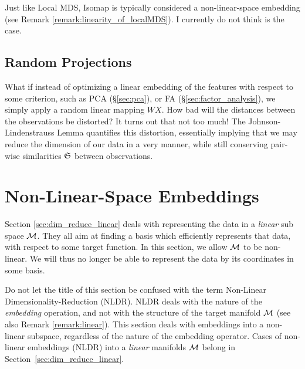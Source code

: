 \begin{remark}
Just like Local MDS, Isomap is typically considered a non-linear-space embedding (see Remark \ref{remark:linearity_of_localMDS}).
I currently do not think is the case.
\end{remark}



\subsection{Random Projections}
\label{sec:random_projections}

What if instead of optimizing a linear embedding of the features with respect to some criterion, such as PCA (\S\ref{sec:pca}), or FA (\S\ref{sec:factor_analysis}), we simply apply a random linear mapping $W X$. How bad will the distances between the observations be distorted? 
It turns out that not too much!
The Johnson-Lindenstrauss Lemma \citep{johnson_extensions_1984} quantifies this distortion, essentially implying that we may reduce the dimension of our data in a very \naive manner, while still conserving pair-wise similarities $\mathfrak{S}$ between observations.
 







\section{Non-Linear-Space Embeddings}
\label{sec:dim_reduce_nonlinear}


Section \ref{sec:dim_reduce_linear} deals with representing the data in a \emph{linear} sub space $\mathcal{M}$. They all aim at finding a basis which efficiently represents that data, with respect to some target function. 
In this section, we allow $\mathcal{M}$ to be non-linear. 
We will thus no longer be able to represent the data by its coordinates in some basis.


\begin{remark}
\label{remark:nldr}
	Do not let the title of this section be confused with the term Non-Linear Dimensionality-Reduction (NLDR).
	NLDR deals with the nature of the \emph{embedding} operation, and not with the structure of the target manifold $\mathcal{M}$ (see also Remark \ref{remark:linear}).
	This section deals with embeddings into a non-linear subspace, regardless of the nature of the embedding operator.
	Cases of non-linear embeddings (NLDR) into a \emph{linear} manifolds $\mathcal{M}$ belong in Section~\ref{sec:dim_reduce_linear}.
\end{remark}




